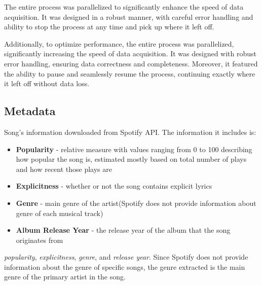 The entire process was parallelized to significantly enhance the speed of data
acquisition. It was designed in a robust manner, with careful error handling
and ability to stop the process at any  time and pick up where it left off.

Additionally, to optimize performance, the entire process was parallelized,
significantly increasing the speed of data acquisition. It was designed with
robust error handling, ensuring data correctness and completeness. Moreover, it
featured the ability to pause and seamlessly resume the process, continuing
exactly where it left off without data loss.




\subsection{Metadata}
\label{sec:metadata}
Song's information downloaded from Spotify API. The information it includes is:

\begin{itemize}
  \item \textbf{Popularity} - relative measure with values ranging from 0 to
    100 describing how popular the song is, estimated mostly based on total
    number of plays and how recent  those plays are
  \item \textbf{Explicitness} - whether or not the song contains explicit lyrics
  \item \textbf{Genre} - main genre of the artist(Spotify does not provide
    information about genre of each musical track)
  \item \textbf{Album Release Year} - the release year of the album that the
    song originates from
\end{itemize}

\textit{popularity}, \textit{explicitness},
\textit{genre}, and \textit{release year}. Since Spotify does not provide
information about the genre of specific songs, the genre extracted is the main
genre of the primary artist in the song.



